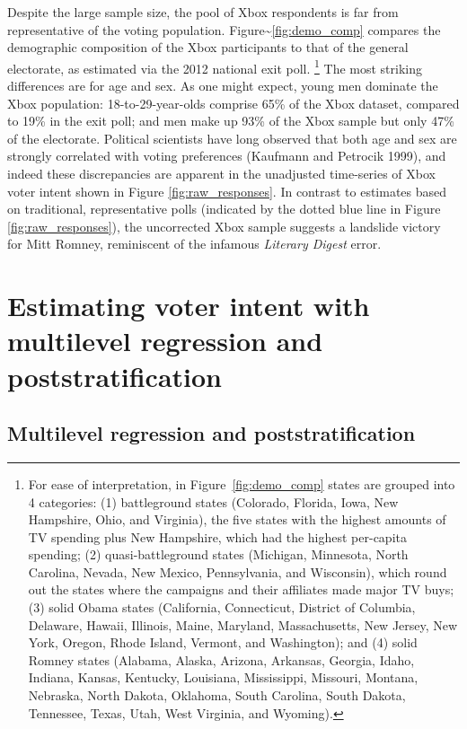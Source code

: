 Despite the large sample size, the pool of Xbox respondents is far from
representative of the voting population.
Figure\textasciitilde{}\ref{fig:demo_comp} compares the demographic
composition of the Xbox participants to that of the general electorate,
as estimated via the 2012 national exit poll. \footnote{For ease of
interpretation, in Figure~\ref{fig:demo_comp} states are grouped into 4 categories:
(1) battleground states (Colorado, Florida, Iowa, New Hampshire, Ohio, and
Virginia), the five states with the highest amounts of TV spending plus New
Hampshire, which had the highest per-capita spending; (2) quasi-battleground
states (Michigan, Minnesota, North Carolina, Nevada, New Mexico, Pennsylvania,
and Wisconsin), which round out the states where the campaigns and their
affiliates made major TV buys; (3) solid Obama states (California, Connecticut,
District of Columbia, Delaware, Hawaii, Illinois, Maine, Maryland,
Massachusetts, New Jersey, New York, Oregon, Rhode Island, Vermont, and
Washington); and (4) solid Romney states (Alabama, Alaska, Arizona, Arkansas,
Georgia, Idaho, Indiana, Kansas, Kentucky, Louisiana, Mississippi, Missouri,
Montana, Nebraska, North Dakota, Oklahoma, South Carolina, South Dakota,
Tennessee, Texas, Utah, West Virginia, and Wyoming).} The most striking
differences are for age and sex. As one might expect, young men dominate
the Xbox population: 18-to-29-year-olds comprise 65\% of the Xbox
dataset, compared to 19\% in the exit poll; and men make up 93\% of the
Xbox sample but only 47\% of the electorate. Political scientists have
long observed that both age and sex are strongly correlated with voting
preferences (Kaufmann and Petrocik 1999), and indeed these discrepancies
are apparent in the unadjusted time-series of Xbox voter intent shown in
Figure \ref{fig:raw_responses}. In contrast to estimates based on
traditional, representative polls (indicated by the dotted blue line in
Figure \ref{fig:raw_responses}), the uncorrected Xbox sample suggests a
landslide victory for Mitt Romney, reminiscent of the infamous
\emph{Literary Digest} error.

\section{Estimating voter intent with multilevel regression and
poststratification}\label{estimating-voter-intent-with-multilevel-regression-and-poststratification}

\subsection{Multilevel regression and
poststratification}\label{multilevel-regression-and-poststratification}

